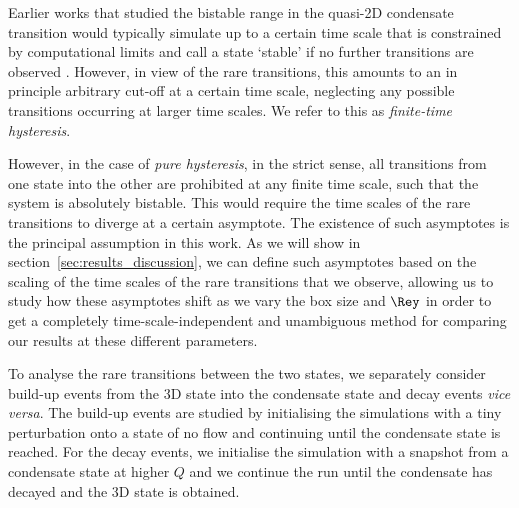 \documentclass[]{jfm}
\begin{document}
Earlier works that studied the bistable range in the quasi-2D condensate transition would typically simulate up to a certain time scale that is constrained by computational limits and call a state `stable' if no further transitions are observed \citep{Favier2019,VanKan2019,DeWit2022,Yokoyama2017}. However, in view of the rare transitions, this amounts to an in principle arbitrary cut-off at a certain time scale, neglecting any possible transitions occurring at larger time scales. We refer to this as \textit{finite-time hysteresis}.

However, in the case of \textit{pure hysteresis}, in the strict sense, all transitions from one state into the other are prohibited at any finite time scale, such that the system is absolutely bistable. This would require the time scales of the rare transitions to diverge at a certain asymptote. The existence of such asymptotes is the principal assumption in this work. As we will show in section~\ref{sec:results_discussion}, we can define such asymptotes based on the scaling of the time scales of the rare transitions that we observe, allowing us to study how these asymptotes shift as we vary the box size and $\Rey$ in order to get a completely time-scale-independent and unambiguous method for comparing our results at these different parameters.

To analyse the rare transitions between the two states, we separately consider build-up events from the 3D state into the condensate state and decay events \textit{vice versa}. The build-up events are studied by initialising the simulations with a tiny perturbation onto a state of no flow and continuing until the condensate state is reached. For the decay events, we initialise the simulation with a snapshot from a condensate state at higher $Q$ and we continue the run until the condensate has decayed and the 3D state is obtained.
\end{document}
